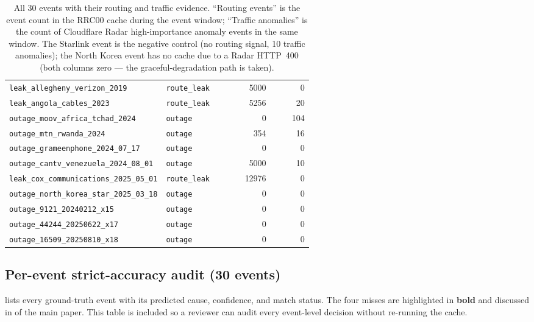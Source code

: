 \documentclass[sigcomm,nonatbib]{acmart}
\begin{document}
\begin{table}[t][h]
\begin{tabular}{p{0.40\linewidth}p{0.18\linewidth}rr}
\texttt{leak\_allegheny\_verizon\_2019} & \texttt{route\_leak} & 5000 & 0 \\
\texttt{leak\_angola\_cables\_2023} & \texttt{route\_leak} & 5256 & 20 \\
\texttt{outage\_moov\_africa\_tchad\_2024} & \texttt{outage} & 0 & 104 \\
\texttt{outage\_mtn\_rwanda\_2024} & \texttt{outage} & 354 & 16 \\
\texttt{outage\_grameenphone\_2024\_07\_17} & \texttt{outage} & 0 & 0 \\
\texttt{outage\_cantv\_venezuela\_2024\_08\_01} & \texttt{outage} & 5000 & 10 \\
\texttt{leak\_cox\_communications\_2025\_05\_01} & \texttt{route\_leak} & 12976 & 0 \\
\texttt{outage\_north\_korea\_star\_2025\_03\_18} & \texttt{outage} & 0 & 0 \\
\texttt{outage\_9121\_20240212\_x15} & \texttt{outage} & 0 & 0 \\
\texttt{outage\_44244\_20250622\_x17} & \texttt{outage} & 0 & 0 \\
\texttt{outage\_16509\_20250810\_x18} & \texttt{outage} & 0 & 0 \\
\hline
\end{tabular}
\caption{All 30 events with their routing and
traffic evidence. ``Routing events'' is the
event count in the RRC00 cache during the
event window; ``Traffic anomalies'' is the
count of Cloudflare Radar high-importance
anomaly events in the same window. The
Starlink event is the negative control (no
routing signal, 10 traffic anomalies); the
North Korea event has no cache due to a \cf{}
Radar HTTP~400 (both columns zero --- the
graceful-degradation path is taken).}
\label{tab:s17-per-event}
\end{table}

\subsection{Per-event strict-accuracy audit (30 events)}
\label{sec:supp-per-event}

 lists every ground-truth
event with its predicted cause, confidence, and
match status. The four misses are highlighted in
\textbf{bold} and discussed in
 of the main paper. This table
is included so a reviewer can audit every
event-level decision without re-running the
cache.
\end{document}
